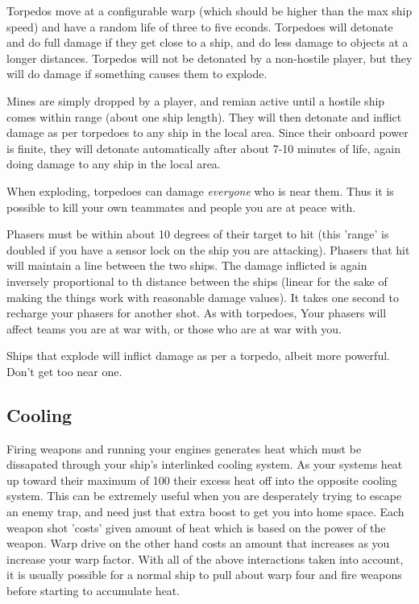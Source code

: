 Torpedos move at a configurable warp (which should be higher than the max ship speed)
 and have a random life of three to five
econds.  Torpedoes will detonate and do full damage if
they get close to a ship, and do less damage to objects at a
longer distances.  Torpedos will not be detonated by a non-hostile
player, but they will do damage if something causes them to explode.

Mines are simply dropped by a player, and remian active until a hostile ship comes
within range (about one ship length).  They will then detonate and inflict damage
as per torpedoes to any ship in the local area.  Since their onboard power is finite,
they will detonate automatically after about 7-10 minutes of life, again doing
damage to any ship in the local area.

When exploding, torpedoes can damage {\em everyone} who is near them.
Thus it is possible to kill your own teammates and people you are at
peace with.

Phasers must be within about 10 degrees of their target to hit (this 'range' is doubled
if you have a sensor lock on the ship you are attacking).
Phasers that hit will maintain a line between the two ships.  The damage
inflicted is again inversely proportional to th distance between the
ships (linear for the sake of making the things work with reasonable
damage values).
It takes one second to recharge your phasers for
another shot.  As with torpedoes, Your phasers will affect teams 
you are at war with, or those who are at war with you.

Ships that explode will inflict damage as per a torpedo, albeit more powerful.  
Don't get too near one.

\subsection{Cooling}

Firing weapons and running your engines generates heat which must be
dissapated through your ship's interlinked cooling system. As your
systems heat up toward their maximum of 100%
their excess heat off into the opposite cooling system. This can be
extremely useful when you are desperately trying to escape an enemy
trap, and need just that extra boost to get you into home space. Each
weapon shot 'costs' given amount of heat which is based on the power of
the weapon. Warp drive on the other hand costs an amount that increases
as you increase your warp factor. With all of the above interactions
taken into account, it is usually possible for a normal ship to pull
about warp four and fire weapons before starting to accumulate heat.

